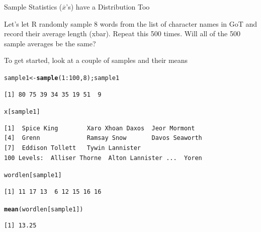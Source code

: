\documentclass{beamer}\usepackage[]{graphicx}\usepackage[]{color}
\makeatletter
\newcommand{\hlnum}[1]{\textcolor[rgb]{0.2,0.2,0.2}{#1}}%
\newcommand{\hlopt}[1]{\textcolor[rgb]{0.102,0.102,0.102}{#1}}%
\newcommand{\hlstd}[1]{\textcolor[rgb]{0.102,0.102,0.102}{#1}}%
\newcommand{\hlkwb}[1]{\textcolor[rgb]{0.102,0.102,0.102}{#1}}%
\newcommand{\hlkwd}[1]{\textcolor[rgb]{0.102,0.102,0.102}{\textbf{#1}}}%
\newenvironment{kframe}{%
 \def\at@end@of@kframe{}%
 \ifinner\ifhmode%
  \def\at@end@of@kframe{\end{minipage}}%
  \begin{minipage}{\columnwidth}%
 \fi\fi%
 \def\FrameCommand##1{\hskip\@totalleftmargin \hskip-\fboxsep
 \colorbox{shadecolor}{##1}\hskip-\fboxsep
     \hskip-\linewidth \hskip-\@totalleftmargin \hskip\columnwidth}%
 \MakeFramed {\advance\hsize-\width
   \@totalleftmargin\z@ \linewidth\hsize
   \@setminipage}}%
 {\par\unskip\endMakeFramed%
 \at@end@of@kframe}
\newenvironment{knitrout}{}{} %
\renewenvironment{knitrout}{\begin{spacing}{0.75}\begin{tiny}}{\end{tiny}\end{spacing}}
\newcommand{\xbar}{\overline{x}}
\makeatother
\begin{document}
\begin{frame}{Sample Statistics ($\xbar$'s) have a Distribution Too\;\;}
\newpage

Let's let R randomly sample 8 words from the list of character names in GoT and record their 
average length (xbar). 
\vskip0.25cm
Repeat this 500 times. 
\vskip0.25cm
Will all of the 500 sample averages be the same?

\newpage

To get started, look at a couple of samples and their means

\begin{knitrout}\small
{}\color{fgcolor}\begin{kframe}
\begin{alltt}
\hlstd{sample1} \hlkwb{<-} \hlkwd{sample}\hlstd{(}\hlnum{1}\hlopt{:}\hlnum{100}\hlstd{,}\hlnum{8}\hlstd{);   sample1}
\end{alltt}
\begin{verbatim}
[1] 80 75 39 34 35 19 51  9
\end{verbatim}
\begin{alltt}
\hlstd{x[sample1]}
\end{alltt}
\begin{verbatim}
[1]  Spice King        Xaro Xhoan Daxos  Jeor Mormont    
[4]  Grenn             Ramsay Snow       Davos Seaworth  
[7]  Eddison Tollett   Tywin Lannister 
100 Levels:  Alliser Thorne  Alton Lannister ...  Yoren
\end{verbatim}
\begin{alltt}
\hlstd{wordlen[sample1]}
\end{alltt}
\begin{verbatim}
[1] 11 17 13  6 12 15 16 16
\end{verbatim}
\begin{alltt}
\hlkwd{mean}\hlstd{(wordlen[sample1])}
\end{alltt}
\begin{verbatim}
[1] 13.25
\end{verbatim}
\end{kframe}
\end{knitrout}

\newpage


\end{frame}
\end{document}
